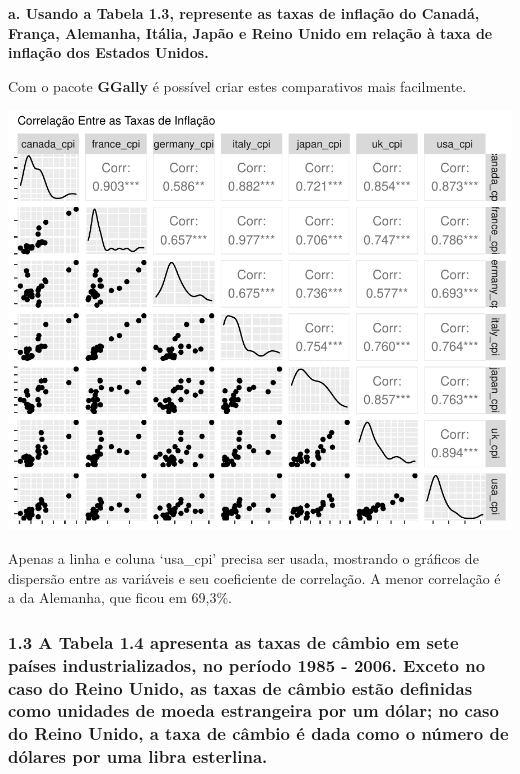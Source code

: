 \documentclass[
  11pt,
  a4paper,
]{article}
\begin{document}
\textbf{a. Usando a Tabela 1.3, represente as taxas de inflação do Canadá, França, Alemanha, Itália, Japão e Reino Unido em relação à taxa de inflação dos Estados Unidos.}

Com o pacote \textbf{GGally} é possível criar estes comparativos mais facilmente.

\begin{center}\includegraphics{article_files/figure-latex/unnamed-chunk-6-1} \end{center}

Apenas a linha e coluna `usa\_cpi' precisa ser usada, mostrando o gráficos de dispersão entre as variáveis e seu coeficiente de correlação. A menor correlação é a da Alemanha, que ficou em 69,3\%.

\hypertarget{a-tabela-1.4-apresenta-as-taxas-de-cuxe2mbio-em-sete-pauxedses-industrializados-no-peruxedodo-1985---2006.-exceto-no-caso-do-reino-unido-as-taxas-de-cuxe2mbio-estuxe3o-definidas-como-unidades-de-moeda-estrangeira-por-um-duxf3lar-no-caso-do-reino-unido-a-taxa-de-cuxe2mbio-uxe9-dada-como-o-nuxfamero-de-duxf3lares-por-uma-libra-esterlina.}{%
\subsubsection{1.3 A Tabela 1.4 apresenta as taxas de câmbio em sete países industrializados, no período 1985 - 2006. Exceto no caso do Reino Unido, as taxas de câmbio estão definidas como unidades de moeda estrangeira por um dólar; no caso do Reino Unido, a taxa de câmbio é dada como o número de dólares por uma libra esterlina.}\label{a-tabela-1.4-apresenta-as-taxas-de-cuxe2mbio-em-sete-pauxedses-industrializados-no-peruxedodo-1985---2006.-exceto-no-caso-do-reino-unido-as-taxas-de-cuxe2mbio-estuxe3o-definidas-como-unidades-de-moeda-estrangeira-por-um-duxf3lar-no-caso-do-reino-unido-a-taxa-de-cuxe2mbio-uxe9-dada-como-o-nuxfamero-de-duxf3lares-por-uma-libra-esterlina.}}
\end{document}
